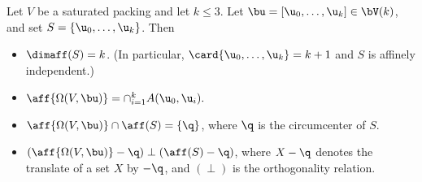 \begin{lemma}[]\label{lemma:aff-center} 
Let $V$ be a saturated packing and let $k\le 3$.
Let $\bu=[\u_0,\ldots,\u_k]\in \bV(k)$, and set $S = \{\u_0,\ldots,\u_k\}$.
Then
\begin{itemize} 
\item $\dimaff (S)= k$.  (In particular, $\card\{\u_0,\ldots,\u_k\}=k+1$ and
$S$ is affinely independent.)
\item $\aff{\Omega(V,\bu)}= \cap_{i=1}^k A(\u_0,\u_i).$
\item $\aff{\Omega(V,\bu)} \cap \aff(S) = \{\q\}$, 
where $\q$ is the circumcenter of $S$.
\item $(\aff{\Omega(V,\bu)}-\q) \perp (\aff(S)-\q)$, where
  $X-\q$ denotes the translate of a set $X$ by $-\q$, and $(\perp)$ is
  the orthogonality relation.
\end{itemize}
\end{lemma}


